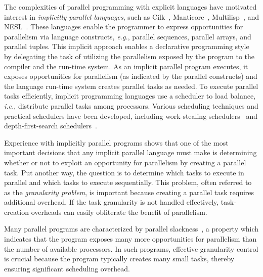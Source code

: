 The complexities of parallel programming with explicit languages have
motivated interest in {\em implicitly parallel languages}, such as
Cilk~\cite{Blumofe95},
Manticore~\cite{Fluet:2008:SFG:1411204.1411239,FluetRaReSh11},
Multilisp~\cite{Halstead85}, and NESL~\cite{nesl-implement}.  These
languages enable the programmer to express opportunities for
parallelism via language constructs, \textit{e.g.}, parallel
sequences, parallel arrays, and parallel tuples.  This implicit
approach enables a declarative programming style by delegating the
task of utilizing the parallelism exposed by the program to the
compiler and the run-time system.  As an implicit parallel program
executes, it exposes opportunities for parallelism (as indicated by
the parallel constructs) and the language run-time system creates
parallel tasks as needed.  To execute parallel tasks efficiently,
implicit programming languages use a scheduler to load balance,
\textit{i.e.}, distribute parallel tasks among processors.  Various
scheduling techniques and practical schedulers have been developed,
including work-stealing
schedulers~\cite{BlumofeWorkStealing,AroraBlPl98,AcarBlBl02} and
depth-first-search schedulers~\cite{BlellochGr96}.

Experience with implicitly parallel programs shows that one of the
most important decisions that any implicit parallel language must make
is determining whether or not to exploit an opportunity for
parallelism by creating a parallel task.  Put another way, the
question is to determine which tasks to execute in parallel and which
tasks to execute sequentially.  This problem, often referred to as the
{\em granularity problem}, is important because creating a parallel
task requires additional overhead. If the task granularity is not
handled effectively, task-creation overheads can easily obliterate the
benefit of parallelism.


Many parallel programs are characterized by parallel
slackness~\cite{Valiant90}, a property which indicates that the
program exposes many more opportunities for parallelism than the
number of available processors. In such programs, effective
granularity control is crucial because the program typically creates
many small tasks, thereby ensuring significant scheduling overhead.


